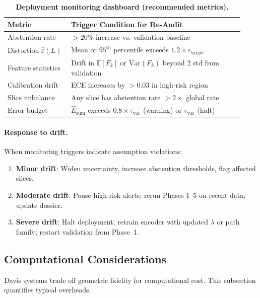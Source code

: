 \documentclass[11pt]{article}
\begin{document}
\begin{table}[H]
\centering
\caption{\textbf{Deployment monitoring dashboard (recommended metrics).}}
\label{tab:monitoring-dashboard}
\begin{tabularx}{\linewidth}{@{}p{0.25\linewidth}p{0.68\linewidth}@{}}
\toprule
\textbf{Metric} & \textbf{Trigger Condition for Re-Audit} \\
\midrule
Abstention rate & $>20\%$ increase vs. validation baseline \\
Distortion $\hat\varepsilon(L)$ & Mean or $95^{\text{th}}$ percentile exceeds $1.2 \times \varepsilon_{\text{target}}$ \\
Feature statistics & Drift in $\mathbb{E}[F_k]$ or $\text{Var}(F_k)$ beyond 2 std from validation \\
Calibration drift & ECE increases by $>0.03$ in high-risk region \\
Slice imbalance & Any slice has abstention rate $>2\times$ global rate \\
Error budget & $\hat E_{\text{sum}}$ exceeds $0.8 \times \tau_{\mathrm{vac}}$ (warning) or $\tau_{\mathrm{vac}}$ (halt) \\
\bottomrule
\end{tabularx}
\end{table}

\paragraph{Response to drift.}
When monitoring triggers indicate assumption violations:
\begin{enumerate}[label=(\alph*),leftmargin=*]
  \item \textbf{Minor drift}: Widen uncertainty, increase abstention thresholds, flag affected slices.
  \item \textbf{Moderate drift}: Pause high-risk alerts; rerun Phases 1--5 on recent data; update dossier.
  \item \textbf{Severe drift}: Halt deployment; retrain encoder with updated $\lambda$ or path family; restart validation from Phase~1.
\end{enumerate}

\subsection{Computational Considerations}
\label{subsec:computational-ops}

Davis systems trade off geometric fidelity for computational cost. This subsection quantifies typical overheads.
\end{document}
